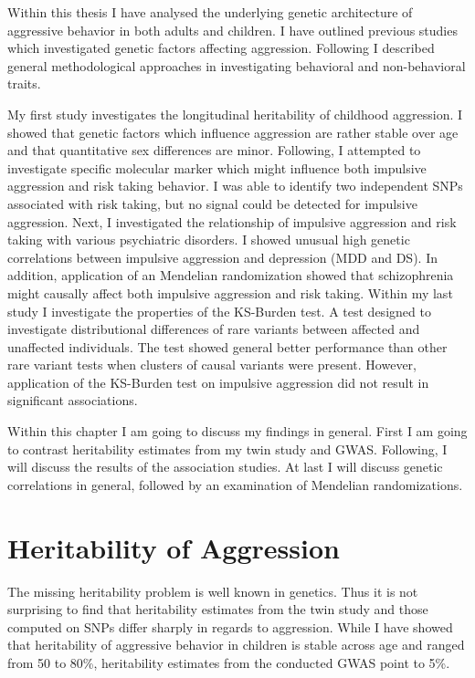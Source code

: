 
Within this thesis I have analysed the underlying genetic architecture of aggressive behavior in both adults and children.
I have outlined previous studies which investigated genetic factors affecting aggression.
Following I described general methodological approaches in investigating behavioral and non-behavioral traits.

My first study investigates the longitudinal heritability of childhood aggression.
I showed that genetic factors which influence aggression are rather stable over age and that quantitative sex differences are minor.
Following, I attempted to investigate specific molecular marker which might influence both impulsive aggression and risk taking behavior.
I was able to identify two independent SNPs associated with risk taking, but no signal could be detected for impulsive aggression.
Next, I investigated the relationship of impulsive aggression and risk taking with various psychiatric disorders.
I showed unusual high genetic correlations between impulsive aggression and depression (MDD and DS).
In addition, application of an Mendelian randomization showed that schizophrenia might causally affect both impulsive aggression and risk taking.
Within my last study I investigate the properties of the KS-Burden test.
A test designed to investigate distributional differences of rare variants between affected and unaffected individuals.
The test showed general better performance than other rare variant tests when clusters of causal variants were present.
However, application of the KS-Burden test on impulsive aggression did not result in significant associations.

Within this chapter I am going to discuss my findings in general.
First I am going to contrast heritability estimates from  my twin study and GWAS\@.
Following, I will discuss the results of the association studies.
At last I will discuss genetic correlations in general, followed by an examination of Mendelian randomizations.

\section{Heritability of Aggression}
\label{sec:heritability_of_aggression}

The missing heritability problem is well known in genetics.
Thus it is not surprising to find that heritability estimates from the twin study and those computed on SNPs differ sharply in regards to aggression.
While I have showed that heritability of aggressive behavior in children is stable across age and ranged from 50 to 80\%, heritability estimates from the conducted GWAS point to 5\%. 

